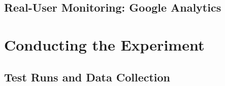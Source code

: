 



\subsection{Real-User Monitoring: Google Analytics}








\section{Conducting the Experiment}


\subsection{Test Runs and Data Collection}





